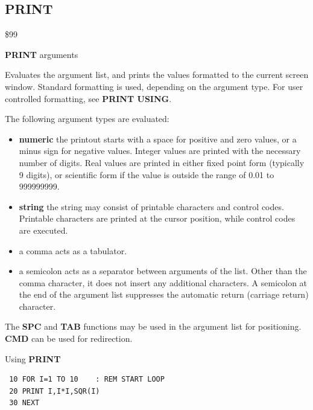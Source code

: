 \subsection{PRINT}
\begin{description}[leftmargin=2cm,style=nextline]
\item [Token:] \$99
\item [Format:] {\bf PRINT} arguments
\item [Usage:]  Evaluates the argument list, and prints the values
                formatted to the current screen window.
                Standard formatting is used, depending on the
                argument type. For user controlled formatting,
                see {\bf PRINT USING}.

                The following argument types are evaluated:
                \begin{itemize}
                    \item {\bf numeric} the printout starts with a space
                    for positive and zero values, or a minus sign for
                    negative values. Integer values are printed with
                    the necessary number of digits. Real values are
                    printed in either fixed point form (typically
                    9 digits), or scientific form if the value is
                    outside the range of 0.01 to 999999999.

                    \item {\bf string} the string may consist of printable
                    characters and control codes. Printable characters
                    are printed at the cursor position, while control
                    codes are executed.

                    \item \screentext{,} a comma acts as a tabulator.

                    \item \screentext{;} a semicolon acts as a separator between
                    arguments of the list. Other than the comma character,
                    it does not insert any additional characters.
                    A semicolon at the end of the argument list suppresses
                    the automatic return (carriage return) character.
                \end{itemize}
\item [Remarks:] The {\bf SPC} and {\bf TAB} functions
                 may be used in the argument list
                 for positioning.
                 {\bf CMD} can be used for redirection.

\item [Example:] Using {\bf PRINT}

\begin{tcolorbox}[colback=black,coltext=white]
\verbatimfont{\codefont}
\begin{verbatim}
 10 FOR I=1 TO 10    : REM START LOOP
 20 PRINT I,I*I,SQR(I)
 30 NEXT
\end{verbatim}
\end{tcolorbox}
\end{description}

